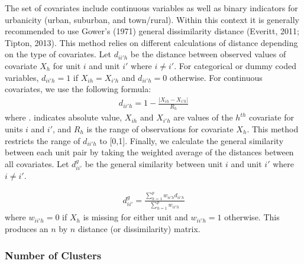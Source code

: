 \documentclass[man,floatsintext]{apa6}
\theoremstyle{definition}
\theoremstyle{definition}
\theoremstyle{definition}
\theoremstyle{remark}
\begin{document}
The set of covariates include continuous variables as well as binary
indicators for urbanicity (urban, suburban, and town/rural). Within this
context it is generally recommended to use Gower's (1971) general
dissimilarity distance (Everitt, 2011; Tipton, 2013). This method relies
on different calculations of distance depending on the type of
covariates. Let \(d_{ii'h}\) be the distance between observed values of
covariate \(X_{h}\) for unit \(i\) and unit \(i'\) where \(i \ne i'\).
For categorical or dummy coded variables, \(d_{ii'h} = 1\) if
\(X_{ih} = X_{i'h}\) and \(d_{ii'h} = 0\) otherwise. For continuous
covariates, we use the following formula: \begin{align}
  d_{ii'h} = 1 - \frac{|X_{ih} - X_{i'h}|}{R_h}
\end{align} where \textbar{}.\textbar{} indicates absolute value,
\(X_{ih}\) and \(X_{i'h}\) are values of the \(h^{th}\) covariate for
units \(i\) and \(i'\), and \(R_h\) is the range of observations for
covariate \(X_h\). This method restricts the range of \(d_{ii'h}\) to
{[}0,1{]}. Finally, we calculate the general similarity between each
unit pair by taking the weighted average of the distances between all
covariates. Let \(d^{g}_{ii'}\) be the general similarity between unit
\(i\) and unit \(i'\) where \(i \ne i'\).

\begin{align}
  d^{g}_{ii'} = \frac{\sum^p_{h = 1}w_{ii'h}d_{ii'h}}{\sum^p_{h = 1}w_{ii'h}}
\end{align} where \(w_{ii'h} = 0\) if \(X_h\) is missing for either unit
and \(w_{ii'h} = 1\) otherwise. This produces an \(n\) by \(n\) distance
(or dissimilarity) matrix.

\hypertarget{number-of-clusters}{%
\subsubsection{Number of Clusters}\label{number-of-clusters}}
\end{document}
